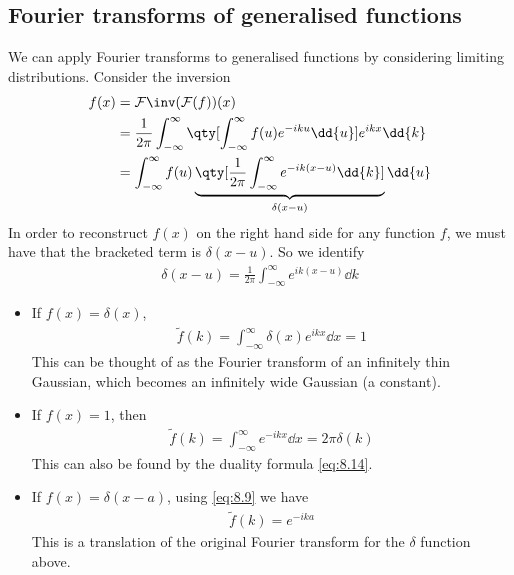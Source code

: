 \subsection{Fourier transforms of generalised functions}
We can apply Fourier transforms to generalised functions by considering limiting distributions.
Consider the inversion
\begin{align*}
	f(x) & = \mathcal F\inv(\mathcal F(f))(x) \\
	     & = \frac{1}{2\pi} \int_{-\infty}^\infty \qty[\int_{-\infty}^\infty f(u) e^{-iku} \dd{u}] e^{ikx} \dd{k} \\
	     & = \int_{-\infty}^\infty f(u) \underbrace{\qty[\frac{1}{2\pi} \int_{-\infty}^\infty e^{-ik(x-u)} \dd{k}]}_{\delta(x-u)} \dd{u}
\end{align*}
In order to reconstruct $f(x)$ on the right hand side for any function $f$, we must have that the bracketed term is $\delta(x-u)$.
So we identify
\begin{align*}
	\delta(x-u) = \frac{1}{2\pi} \int_{-\infty}^\infty e^{ik(x-u)} \dd{k}
\end{align*}
\begin{itemize}
	\item If $f(x) = \delta(x)$,
	\begin{align} \label{eq:8.21}
		\widetilde f(k) = \int_{-\infty}^\infty \delta(x) e^{ikx} \dd{x} = 1
	\end{align}
	This can be thought of as the Fourier transform of an infinitely thin Gaussian, which becomes an infinitely wide Gaussian (a constant).
	\item If $f(x) = 1$, then
	\begin{align} \label{eq:8.22}
		\widetilde f(k) = \int_{-\infty}^\infty e^{-ikx}\dd{x} = 2\pi \delta(k)
	\end{align}
	This can also be found by the duality formula \cref{eq:8.14}.
	\item If $f(x) = \delta(x - a)$, using \cref{eq:8.9} we have
	\begin{align} \label{eq:8.23}
		\widetilde f(k) = e^{-ika}
	\end{align}
	This is a translation of the original Fourier transform for the $\delta$ function above.
\end{itemize} 

